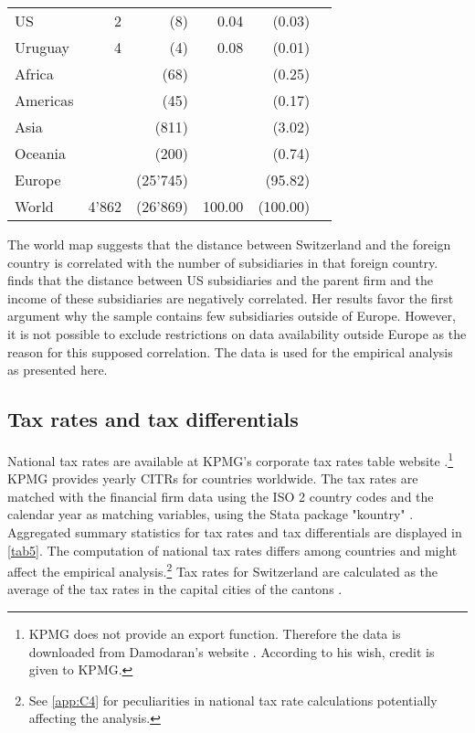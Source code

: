 \documentclass[10pt,twocolumn,oneside,cmyk]{article}
\begin{document}
\begin{table}
\begin{center}
\begin{tabularx}{\linewidth}{p{}r r r r r}
   US &2 &(8) &0.04 &(0.03)\\
   Uruguay&4 &(4) &0.08 &(0.01)\\
   \midrule
   Africa & &(68) & &(0.25)\\
   Americas & &(45) & &(0.17)\\
   Asia & &(811) & &(3.02)\\
   Oceania & &(200) & &(0.74)\\
   Europe & &(25'745) & &(95.82)\\
   World &4'862 &(26'869) &100.00 &(100.00)\\
   \bottomrule
  \end{tabularx}
 \end{center}
\end{table}

The world map suggests that the distance between Switzerland and the foreign country is correlated with the number of subsidiaries in that foreign country. \textcite[716]{clausing_effect_2016} finds that the distance between US subsidiaries and the parent firm and the income of these subsidiaries are negatively correlated. Her results favor the first argument why the sample contains few subsidiaries outside of Europe. However, it is not possible to exclude restrictions on data availability outside Europe as the reason for this supposed correlation. The data is used for the empirical analysis as presented here.

\subsection{Tax rates and tax differentials} \label{sec:Tax rates and tax differentials}
National tax rates are available at KPMG's corporate tax rates table website \parencite{kpmg_corporate_2017}.\footnote{KPMG does not provide an export function. Therefore the data is downloaded from Damodaran's website \parencite{damodaran_corporate_2017}. According to his wish, credit is given to KPMG.} KPMG provides yearly CITRs for countries worldwide. The tax rates are matched with the financial firm data using the ISO 2 country codes and the calendar year as matching variables, using the Stata package "kountry" \parencite{raciborski_kountry:_2008}. Aggregated summary statistics for tax rates and tax differentials are displayed in \cref{tab5}. The computation of national tax rates differs among countries and might affect the empirical analysis.\footnote{See \cref{app:C4} for peculiarities in national tax rate calculations potentially affecting the analysis.} Tax rates for Switzerland are calculated as the average of the tax rates in the capital cities of the cantons \parencite{kpmg_corporate_2017}.
\end{document}
